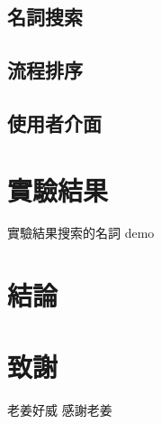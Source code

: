 \documentclass[twocolumn]{article}
\begin{document}
\subsection{名詞搜索}

\subsection{流程排序}

\subsection{使用者介面}

\section{實驗結果}

實驗結果搜索的名詞 demo

\section{結論}

\section{致謝}
老姜好威 感謝老姜
\end{document}
